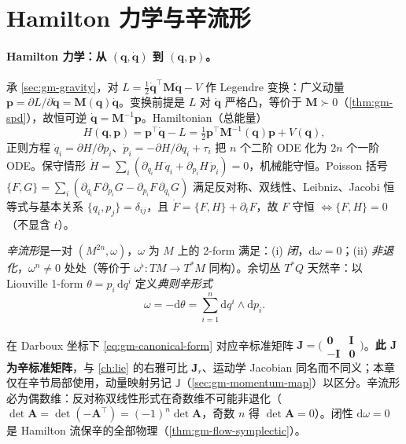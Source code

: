 \section{Hamilton 力学与辛流形}
\label{sec:gm-symplectic}

\paragraph{Hamilton 力学：从 $(\mathbf q,\dot{\mathbf q})$ 到 $(\mathbf q,\mathbf p)$。}
承 \cref{sec:gm-gravity}，对 $L=\tfrac12\dot{\mathbf q}^\top\mathbf M\dot{\mathbf q}-V$ 作 Legendre 变换：广义动量 $\mathbf p=\partial L/\partial\dot{\mathbf q}=\mathbf M(\mathbf q)\dot{\mathbf q}$。变换前提是 $L$ 对 $\dot{\mathbf q}$ 严格凸，等价于 $\mathbf M\succ0$（\cref{thm:gm-spd}），故恒可逆 $\dot{\mathbf q}=\mathbf M^{-1}\mathbf p$。Hamiltonian（总能量）
\begin{equation}
  H(\mathbf q,\mathbf p)=\mathbf p^\top\dot{\mathbf q}-L=\tfrac12\mathbf p^\top\mathbf M^{-1}(\mathbf q)\mathbf p+V(\mathbf q),
  \label{eq:gm-hamiltonian}
\end{equation}
正则方程 $\dot q_i=\partial H/\partial p_i$、$\dot p_i=-\partial H/\partial q_i+\tau_i$ 把 $n$ 个二阶 ODE 化为 $2n$ 个一阶 ODE。保守情形 $\dot H=\sum_i(\partial_{q_i}H\,\dot q_i+\partial_{p_i}H\,\dot p_i)=0$，机械能守恒。Poisson 括号 $\{F,G\}=\sum_i(\partial_{q_i}F\,\partial_{p_i}G-\partial_{p_i}F\,\partial_{q_i}G)$ 满足反对称、双线性、Leibniz、Jacobi 恒等式与基本关系 $\{q_i,p_j\}=\delta_{ij}$，且 $\dot F=\{F,H\}+\partial_t F$，故 $F$ 守恒 $\Leftrightarrow\{F,H\}=0$（不显含 $t$）。

\begin{definition}[辛流形]\label{def:gm-symplectic-manifold}
\emph{辛流形}是一对 $(M^{2n},\omega)$，$\omega$ 为 $M$ 上的 2-form 满足：(i) \emph{闭}，$\mathrm d\omega=0$；(ii) \emph{非退化}，$\omega^n\ne0$ 处处（等价于 $\omega^\flat:TM\to T^*M$ 同构）。余切丛 $T^*Q$ 天然辛：以 Liouville 1-form $\theta=p_i\,\mathrm dq^i$ 定义\emph{典则辛形式}
\begin{equation}
  \omega=-\mathrm d\theta=\sum_{i=1}^n\mathrm dq^i\wedge\mathrm dp_i.
  \label{eq:gm-canonical-form}
\end{equation}
\end{definition}

\begin{remark}
在 Darboux 坐标下 \cref{eq:gm-canonical-form} 对应辛标准矩阵 $\mathbf J=\bigl(\begin{smallmatrix}\mathbf0&\mathbf I\\-\mathbf I&\mathbf0\end{smallmatrix}\bigr)$。\textbf{此 $\mathbf J$ 为辛标准矩阵}，与 \cref{ch:lie} 的右雅可比 $\mathbf J_r$、运动学 Jacobian 同名而不同义；本章仅在辛节局部使用，动量映射另记 $\mathsf J$（\cref{sec:gm-momentum-map}）以区分。辛流形必为偶数维：反对称双线性形式在奇数维不可能非退化（$\det\mathbf A=\det(-\mathbf A^\top)=(-1)^n\det\mathbf A$，奇数 $n$ 得 $\det\mathbf A=0$）。闭性 $\mathrm d\omega=0$ 是 Hamilton 流保辛的全部物理（\cref{thm:gm-flow-symplectic}）。
\end{remark}

